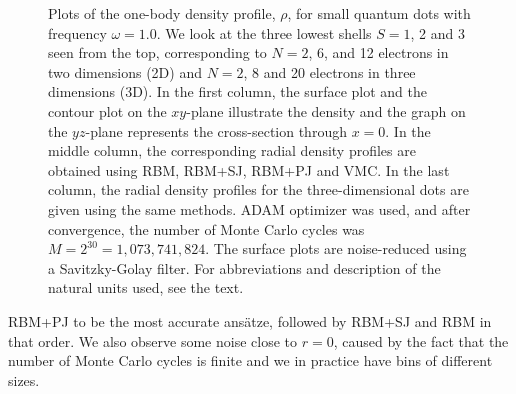 \begin{figure}[H]
	\hspace{0.1cm}
	\hspace{-0.0cm}
	\hspace{-0.5cm}
	
	\caption{Plots of the one-body density profile, $\rho$, for small quantum dots with frequency $\omega=1.0$. We look at the three lowest shells $S=1$, 2 and 3 seen from the top, corresponding to $N=2$, 6, and 12 electrons in two dimensions (2D) and $N=2$, 8 and 20 electrons in three dimensions (3D). In the first column, the surface plot and the contour plot on the $xy$-plane illustrate the density and the graph on the $yz$-plane represents the cross-section through $x=0$. In the middle column, the corresponding radial density profiles are obtained using RBM, RBM+SJ, RBM+PJ and VMC. In the last column, the radial density profiles for the three-dimensional dots are given using the same methods. ADAM optimizer was used, and after convergence, the number of Monte Carlo cycles was $M=2^{30}=1,073,741,824$. The surface plots are noise-reduced using a Savitzky-Golay filter. For  abbreviations and description of the natural units used, see the text.}
	\label{fig:OB_interaction_23D}
\end{figure}
\noindent
RBM+PJ to be the most accurate ansätze, followed by RBM+SJ and RBM in that order. We also observe some noise close to $r=0$, caused by the fact that the number of Monte Carlo cycles is finite and we in practice have bins of different sizes.

